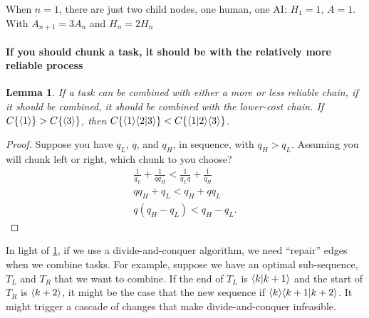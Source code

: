 \documentclass{article}
\newtheorem{lemma}[theorem]{Lemma}
\begin{document}
When $n = 1$, there are just two child nodes, one human, one AI: $H_1 = 1$, $A = 1$.
With $A_{n+1} = 3 A_{n}$ and $H_n = 2 H_n$

\paragraph{If you should chunk a task, it should be with the relatively more reliable process}

\begin{lemma} \label{lemma:pair_better}
 If a task can be combined with either a more or less reliable chain, if it should be combined, it should be combined with the lower-cost chain.
 If $C\{ \langle 1 \rangle \} > C\{ \langle 3 \rangle \}$, then $C\{ \langle 1 \rangle\langle 2|3 \rangle \} < C\{ \langle 1|2 \rangle\langle 3 \rangle \}$.
 \end{lemma}
\begin{proof}
Suppose you have $q_L$, $q$, and $q_H$, in sequence, with $q_H > q_L$.
Assuming you will chunk left or right, which chunk to you choose?
\begin{align}
 \frac{1}{q_L} + \frac{1}{q q_H} < \frac{1}{q_L q} + \frac{1}{q_H} \\
  q q_H + q_L < q_H + q q_L \\
  q (q_H  - q_L) < q_H - q_L.
\end{align}
\end{proof}

In light of \ref{lemma:pair_better}, if we use a divide-and-conquer algorithm, we need ``repair'' edges when we combine tasks.
For example, suppose we have an optimal sub-sequence, $T_L$ and $T_R$ that we want to combine.
If the end of $T_L$ is $\langle k|k+1 \rangle$ and the start of $T_R$ is $\langle k+2 \rangle$, it might be the case that the new sequence if $\langle k \rangle\langle k+1|k+2 \rangle$. 
It might trigger a cascade of changes that make divide-and-conquer infeasible.
\end{document}
